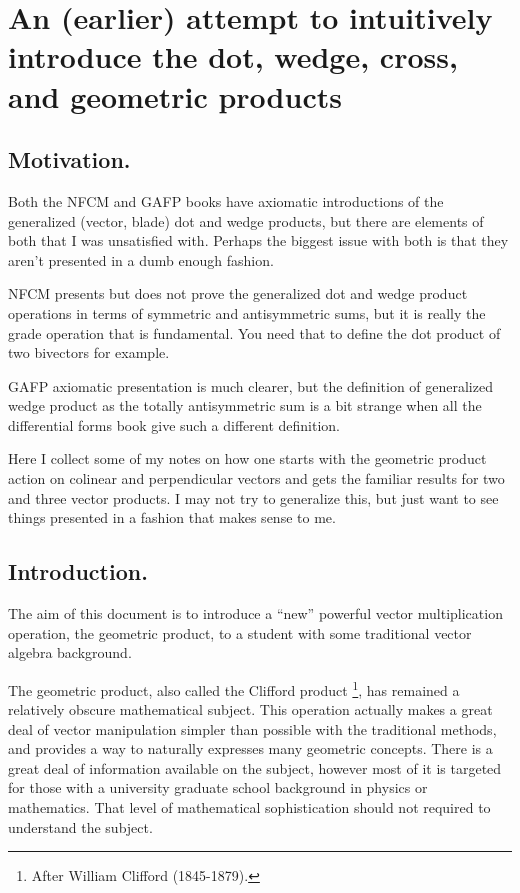 \chapter{An (earlier) attempt to intuitively introduce the dot, wedge, cross, and geometric products}
\label{chap:gaGradeDotWedge}

\date{March 17, 2008.  gaGradeDotWedge.tex}

\section{Motivation. }

Both the NFCM and GAFP books have axiomatic introductions of the 
generalized (vector, blade) dot and wedge products, but there are
elements of both that I was unsatisfied with.  Perhaps the biggest
issue with both is that they aren't presented in a dumb enough fashion.

NFCM presents but
does not prove the generalized dot and wedge product operations
in terms of symmetric and antisymmetric sums, but it is really the
grade operation that is fundamental.  You need that to define the
dot product of two bivectors for example.

GAFP axiomatic presentation is much clearer, but the definition of
generalized wedge product as the totally antisymmetric sum is a bit
strange when all the differential forms book give such a different
definition.

Here I collect some of my notes on how one starts with the geometric
product action on colinear and perpendicular vectors and gets the 
familiar results for two and three vector products.  I may not try to
generalize this, but just want to see things presented in a fashion
that makes sense to me.

\section{Introduction.}

The aim of this document is to introduce a ``new'' powerful vector multiplication operation, the geometric product,
to a student with some traditional vector algebra background.

The geometric product, also called the Clifford product 
\footnote{After William Clifford (1845-1879).}, has remained a relatively obscure mathematical subject. 
This operation actually makes a great deal of vector manipulation simpler than possible with the traditional methods, and
provides a way to naturally expresses many geometric concepts.
There is a great deal of information available on the subject, however most of it is targeted for those with a 
university graduate school background in physics or mathematics.  That level of mathematical sophistication
should not required to understand the subject.


